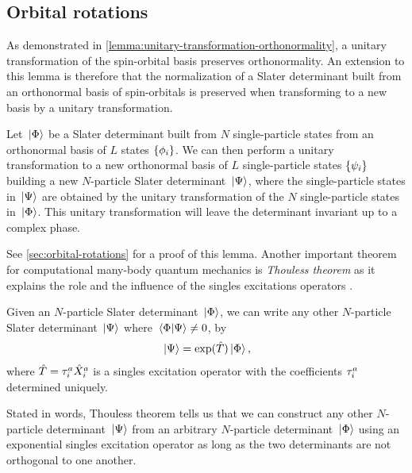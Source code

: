         \subsection{Orbital rotations}
            As demonstrated in
            \autoref{lemma:unitary-transformation-orthonormality}, a unitary
            transformation of the spin-orbital basis preserves orthonormality.
            An extension to this lemma is therefore that the normalization of a
            Slater determinant built from an orthonormal basis of spin-orbitals
            is preserved when transforming to a new basis by a unitary
            transformation.
            \begin{lemma}
                \label{lemma:unitary-transformation-slater}
                Let $\ket*{\Phi}$ be a Slater determinant built from $N$
                single-particle states from an orthonormal basis of $L$ states
                $\left\{ \phi_i \right\}$.
                We can then perform a unitary transformation to a new
                orthonormal basis of $L$ single-particle states $\left\{ \psi_i \right\}$
                building a new $N$-particle Slater determinant $\ket*{\Psi}$,
                where the single-particle states in $\ket*{\Psi}$ are obtained by
                the unitary transformation of the $N$ single-particle states in
                $\ket*{\Phi}$.
                This unitary transformation will leave the determinant invariant
                up to a complex phase.
            \end{lemma}
            See \autoref{sec:orbital-rotations} for a proof of this lemma.
            Another important theorem for computational many-body quantum
            mechanics is \emph{Thouless theorem} as it explains the role and the
            influence of the singles excitations operators
            \cite{thouless1960225}.
            \begin{theorem}
                \label{theorem:thouless}
                Given an $N$-particle Slater determinant $\ket*{\Phi}$, we can
                write any other $N$-particle Slater determinant $\ket*{\Psi}$
                where $\braket*{\Phi}{\Psi} \neq 0$, by
                \begin{align}
                    \ket*{\Psi}
                    = \exponential(\clust)\ket*{\slat},
                \end{align}
                where $\hat{T} = \tau^{a}_{i}\hat{X}^{a}_{i}$ is a singles
                excitation operator with the coefficients $\tau^{a}_{i}$
                determined uniquely.
            \end{theorem}
            Stated in words, Thouless theorem tells us that we can construct any
            other $N$-particle determinant $\ket*{\Psi}$ from an arbitrary
            $N$-particle determinant $\ket*{\Phi}$ using an exponential singles
            excitation operator as long as the two determinants are not
            orthogonal to one another.

